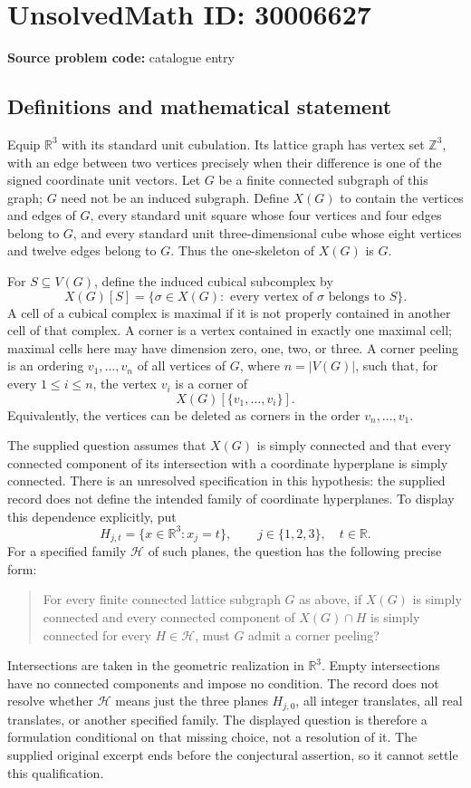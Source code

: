 \documentclass[11pt]{article}
\newcommand{\Z}{\mathbb{Z}}
\newcommand{\R}{\mathbb{R}}
\begin{document}
\section*{UnsolvedMath ID: 30006627}
\textbf{Source problem code:} catalogue entry
\subsection{Definitions and mathematical statement}
Equip \(\R^3\) with its standard unit cubulation. Its lattice graph has vertex set \(\Z^3\), with an edge between two vertices precisely when their difference is one of the signed coordinate unit vectors. Let \(G\) be a finite connected subgraph of this graph; \(G\) need not be an induced subgraph. Define \(X(G)\) to contain the vertices and edges of \(G\), every standard unit square whose four vertices and four edges belong to \(G\), and every standard unit three-dimensional cube whose eight vertices and twelve edges belong to \(G\). Thus the one-skeleton of \(X(G)\) is \(G\).

For \(S\subseteq V(G)\), define the induced cubical subcomplex by
\[
X(G)[S]=\{\sigma\in X(G):\text{ every vertex of }\sigma\text{ belongs to }S\}.
\]
A cell of a cubical complex is maximal if it is not properly contained in another cell of that complex. A corner is a vertex contained in exactly one maximal cell; maximal cells here may have dimension zero, one, two, or three. A corner peeling is an ordering \(v_1,\ldots,v_n\) of all vertices of \(G\), where \(n=|V(G)|\), such that, for every \(1\leq i\leq n\), the vertex \(v_i\) is a corner of
\[
X(G)[\{v_1,\ldots,v_i\}].
\]
Equivalently, the vertices can be deleted as corners in the order \(v_n,\ldots,v_1\).

The supplied question assumes that \(X(G)\) is simply connected and that every connected component of its intersection with a coordinate hyperplane is simply connected. There is an unresolved specification in this hypothesis: the supplied record does not define the intended family of coordinate hyperplanes. To display this dependence explicitly, put
\[
H_{j,t}=\{x\in\R^3:x_j=t\},\qquad j\in\{1,2,3\},\quad t\in\R.
\]
For a specified family \(\mathcal H\) of such planes, the question has the following precise form:
\begin{quote}
For every finite connected lattice subgraph \(G\) as above, if \(X(G)\) is simply connected and every connected component of \(X(G)\cap H\) is simply connected for every \(H\in\mathcal H\), must \(G\) admit a corner peeling?
\end{quote}
Intersections are taken in the geometric realization in \(\R^3\). Empty intersections have no connected components and impose no condition. The record does not resolve whether \(\mathcal H\) means just the three planes \(H_{j,0}\), all integer translates, all real translates, or another specified family. The displayed question is therefore a formulation conditional on that missing choice, not a resolution of it. The supplied original excerpt ends before the conjectural assertion, so it cannot settle this qualification.
\end{document}
